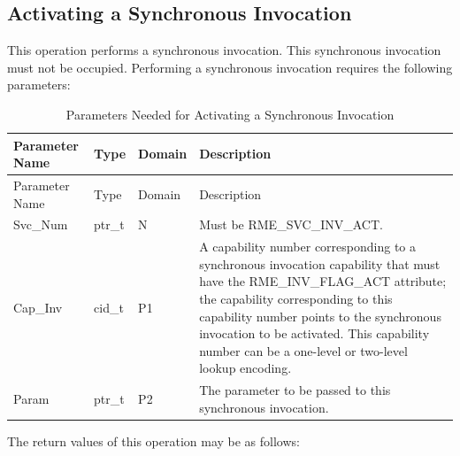 \subsection{Activating a Synchronous Invocation}\label{subsec:5-activate-sync-invocation}

This operation performs a synchronous invocation. This synchronous invocation must not be occupied. Performing a synchronous invocation requires the following parameters:

\begin{xltabular}{\textwidth}{@{}>{\hsize\raggedright\arraybackslash}X>{\hsize\raggedright\arraybackslash}X>{\hsize\raggedright\arraybackslash}X>{\hsize\raggedright\arraybackslash}X@{}}
\caption{Parameters Needed for Activating a Synchronous Invocation}\label{tab:5-10-activate-sync-invocation-parameters}\\
\toprule
Parameter Name & Type & Domain & Description\tabularnewline
\endfirsthead
\toprule
Parameter Name & Type & Domain & Description\tabularnewline
\midrule
\endhead
\bottomrule
\endlastfoot
Svc\_Num & ptr\_t & N & Must be RME\_SVC\_INV\_ACT.\tabularnewline
Cap\_Inv & cid\_t & P1 &
A capability number corresponding to a synchronous invocation capability that must have the RME\_INV\_FLAG\_ACT attribute; the capability corresponding to this capability number points to the synchronous invocation to be activated. This capability number can be a one-level or two-level lookup encoding.\tabularnewline
Param & ptr\_t & P2 & The parameter to be passed to this synchronous invocation.\tabularnewline
\end{xltabular}
\nopagebreak[4]

The return values of this operation may be as follows:


